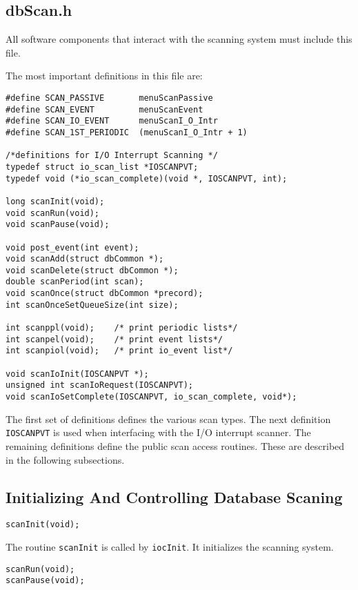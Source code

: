 \subsection{dbScan.h}

All software components that interact with the scanning system must include this file.

The most important definitions in this file are:

\begin{verbatim}
#define SCAN_PASSIVE       menuScanPassive
#define SCAN_EVENT         menuScanEvent
#define SCAN_IO_EVENT      menuScanI_O_Intr
#define SCAN_1ST_PERIODIC  (menuScanI_O_Intr + 1)

/*definitions for I/O Interrupt Scanning */
typedef struct io_scan_list *IOSCANPVT;
typedef void (*io_scan_complete)(void *, IOSCANPVT, int);

long scanInit(void);
void scanRun(void);
void scanPause(void);

void post_event(int event);
void scanAdd(struct dbCommon *);
void scanDelete(struct dbCommon *);
double scanPeriod(int scan);
void scanOnce(struct dbCommon *precord);
int scanOnceSetQueueSize(int size);

int scanppl(void);    /* print periodic lists*/
int scanpel(void);    /* print event lists*/
int scanpiol(void);   /* print io_event list*/

void scanIoInit(IOSCANPVT *);
unsigned int scanIoRequest(IOSCANPVT);
void scanIoSetComplete(IOSCANPVT, io_scan_complete, void*);
\end{verbatim}

The first set of definitions defines the various scan types.
The next definition \verb|IOSCANPVT| is used when interfacing with the I/O interrupt scanner.
The remaining definitions define the public scan access routines.
These are described in the following subsections.

\subsection{Initializing And Controlling Database Scaning}

\begin{verbatim}
scanInit(void);
\end{verbatim}

The routine \verb|scanInit| is called by \verb|iocInit|.
It initializes the scanning system.

\begin{verbatim}
scanRun(void);
scanPause(void);
\end{verbatim}

